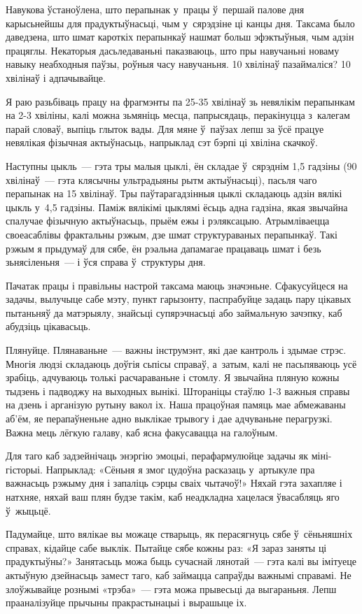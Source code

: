 Навукова ўстаноўлена, што перапынак у~працы ў~першай палове дня карысьнейшы для прадуктыўнасьці, чым у~сярэдзіне ці канцы дня. Таксама было даведзена, што шмат кароткіх перапынкаў нашмат больш эфэктыўныя, чым адзін працяглы. Некаторыя дасьледаваньні паказваюць, што пры навучаньні новаму навыку неабходныя паўзы, роўныя часу навучаньня. 10 хвілінаў пазаймаліся? 10 хвілінаў і адпачывайце.

Я раю разьбіваць працу на фрагмэнты па 25-35 хвілінаў зь невялікім перапынкам на 2-3 хвіліны, калі можна зьмяніць месца, папрысядаць, перакінуцца з~калегам парай словаў, выпіць глыток вады. Для мяне ў~паўзах лепш за ўсё працуе невялікая фізычная актыўнасьць, напрыклад сэт бэрпі ці хвіліна скачкоў. 

Наступны цыкль~--- гэта тры малыя цыклі, ён складае ў~сярэднім 1,5 гадзіны (90 хвілінаў~--- гэта клясычны ультрадыяны рытм актыўнасьці), пасьля чаго перапынак на 15 хвілінаў. Тры паўтарагадзінныя цыклі складаюць адзін вялікі цыкль у~4,5 гадзіны. Паміж вялікімі цыклямі ёсьць адна гадзіна, якая звычайна спалучае фізычную актыўнасьць, прыём ежы і рэляксацыю. Атрымліваецца своеасаблівы фрактальны рэжым, дзе шмат структураваных перапынкаў. Такі рэжым я прыдумаў для сябе, ён рэальна дапамагае працаваць шмат і безь зьнясіленьня~--- і ўся справа ў~структуры дня.

Пачатак працы і правільны настрой таксама маюць значэньне. Сфакусуйцеся на задачы, вылучыце сабе мэту, пункт гарызонту, паспрабуйце задаць пару цікавых пытаньняў да матэрыялу, знайсьці супярэчнасьці або займальную зачэпку, каб абудзіць цікавасьць.

Плянуйце. Плянаваньне~--- важны інструмэнт, які дае кантроль і здымае стрэс. Многія людзі складаюць доўгія сьпісы справаў, а~затым, калі не пасьпяваюць усё зрабіць, адчуваюць толькі расчараваньне і стомлу. Я звычайна пляную кожны тыдзень і падводжу на выходных вынікі. Штораніцы стаўлю 1-3 важныя справы на дзень і арганізую рутыну вакол іх. Наша працоўная памяць мае абмежаваны аб'ём, яе перапаўненьне адно выклікае трывогу і дае адчуваньне перагрузкі. Важна мець лёгкую галаву, каб ясна факусавацца на галоўным.

Для таго каб задзейнічаць энэргію эмоцыі, перафармулюйце задачы як міні-гісторыі. Напрыклад: «Сёньня я змог цудоўна расказаць у~артыкуле пра важнасьць рэжыму дня і запаліць сэрцы сваіх чытачоў!» Няхай гэта захапляе і натхняе, няхай ваш плян будзе такім, каб неадкладна хацелася ўвасабляць яго ў~жыцьцё.

Падумайце, што вялікае вы можаце стварыць, як перасягнуць сябе ў~сёньняшніх справах, кідайце сабе выклік. Пытайце сябе кожны раз: «Я зараз заняты ці прадуктыўны?» Занятасьць можа быць сучаснай лянотай~--- гэта калі вы імітуеце актыўную дзейнасьць замест таго, каб займацца сапраўды важнымі справамі. Не злоўжывайце рознымі «трэба»~--- гэта можа прывесьці да выгараньня. Лепш прааналізуйце прычыны пракрастынацыі і вырашыце іх.

